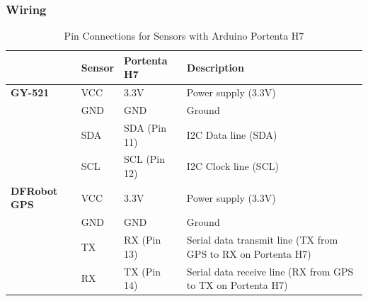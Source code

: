 \subsubsection{Wiring}

\begin{table}[h!]
    \centering
    \begin{tabular}{|l|l|l|p{8cm}|}
    \hline
    \textbf{}         & \textbf{Sensor}       & \textbf{Portenta H7}            & \textbf{Description}                                                    \\ \hline
    \textbf{GY-521}         & VCC                   & 3.3V                            & Power supply (3.3V)                                                     \\ \cline{2-4}
                            & GND                   & GND                             & Ground                                                                  \\ \cline{2-4}
                            & SDA                   & SDA (Pin 11)                    & I2C Data line (SDA)                                                     \\ \cline{2-4}
                            & SCL                   & SCL (Pin 12)                    & I2C Clock line (SCL)                                                    \\ \hline
    \textbf{DFRobot GPS}    & VCC                   & 3.3V                            & Power supply (3.3V)                                                     \\ \cline{2-4}
                            & GND                   & GND                             & Ground                                                                  \\ \cline{2-4}
                            & TX                    & RX (Pin 13)                     & Serial data transmit line \newline (TX from GPS to RX on Portenta H7)   \\ \cline{2-4}
                            & RX                    & TX (Pin 14)                     & Serial data receive line \newline (RX from GPS to TX on Portenta H7)    \\ \hline
    \end{tabular}
    \caption{Pin Connections for Sensors with Arduino Portenta H7}
    \label{tab:sensor_connections}
    \end{table}